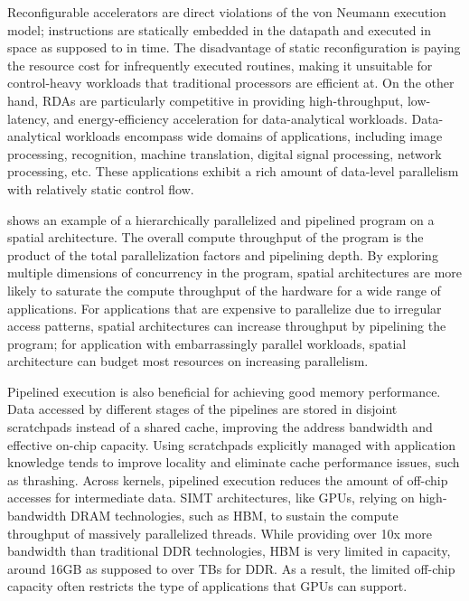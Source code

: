 Reconfigurable accelerators are direct violations of the von Neumann execution model; 
instructions are statically embedded in the datapath and executed in space as supposed to in time.
The disadvantage of static reconfiguration is paying the resource cost for infrequently
executed routines, making it unsuitable for control-heavy workloads that traditional
processors are efficient at.
On the other hand, RDAs are particularly competitive in providing high-throughput, 
low-latency, and energy-efficiency acceleration for data-analytical workloads.
Data-analytical workloads encompass wide domains of applications, including image processing,
recognition, machine translation, digital signal processing, network processing, etc.
These applications exhibit a rich amount of data-level parallelism with relatively static control
flow.

 shows an example of a
hierarchically parallelized and pipelined program on a spatial architecture.
The overall compute throughput of the program is 
the product of the total parallelization factors and pipelining depth.
By exploring multiple dimensions of concurrency in the program, spatial architectures are more likely
to saturate the compute throughput of the hardware for a wide range of applications.
For applications that are expensive to parallelize due to irregular access patterns, spatial
architectures can increase throughput by pipelining the program;
for application with embarrassingly parallel workloads, spatial architecture can budget most
resources on increasing parallelism.

Pipelined execution is also beneficial for achieving good memory performance.
Data accessed by different stages of the pipelines are stored in disjoint scratchpads instead of a
shared cache, improving the address bandwidth and effective on-chip capacity.
Using scratchpads explicitly managed with application knowledge tends to improve locality
and eliminate cache performance issues, such as thrashing.
Across kernels, pipelined execution reduces the amount of off-chip accesses for intermediate
data.
SIMT architectures, like GPUs, relying on high-bandwidth DRAM technologies, such as HBM, to sustain
the compute throughput of massively parallelized threads.
While providing over 10x more bandwidth than traditional DDR technologies, HBM is very limited in
capacity, around 16GB as supposed to over TBs for DDR.
As a result, the limited off-chip capacity often restricts the type of applications that
GPUs can support.


